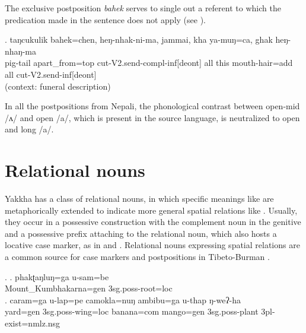 The exclusive postposition \emph{bahek}   serves to single out a referent to which the predication made in the sentence does not apply (see \Next). 

\exg. taŋcukulik bahek=chen,       heŋ-nhak-ni-ma,                       jammai, kha  ya-muŋ=ca,       ghak heŋ-nhaŋ-ma\\
pig-tail apart\_from{\sc =top} cut{\sc -V2.send-compl-inf[deont]} all this mouth-hair{\sc =add} all cut{\sc -V2.send-inf[deont]} \\
 (context: funeral description) 


In all the postpositions from Nepali, the phonological contrast between open-mid /ʌ/ and open /a/, which is present in the source language, is neutralized to open and long /a/.

 
\section{Relational nouns}\label{postpos-2}
  
  Yakkha has a class of relational nouns, in which  specific meanings like  are metaphorically extended to indicate more general spatial relations like . Usually, they occur in a possessive construction with the complement noun in the genitive and a possessive prefix attaching to the relational noun, which also hosts a locative case marker, as in  \Next[a] and \Next[b]. Relational nouns expressing spatial relations are a common source for case markers and postpositions in Tibeto-Burman \citep[62]{DeLancey1985_Etymological}.
  
	\ex. \ag. phakʈaŋluŋ=ga        u-sam=be\\
		Mount\_Kumbhakarna{\sc =gen} {\sc 3sg.poss-}root{\sc =loc}	\\
		  
		\bg. caram=ga    u-lap=pe    camokla=nuŋ   ambibu=ga    u-thap     ŋ-weʔ-ha	\\
		yard{\sc =gen} {\sc 3sg.poss-}wing{\sc =loc} banana{\sc =com} mango{\sc =gen} {\sc 3sg.poss-}plant {\sc 3pl-}exist{\sc [npst]=nmlz.nsg}\\
		 
	
